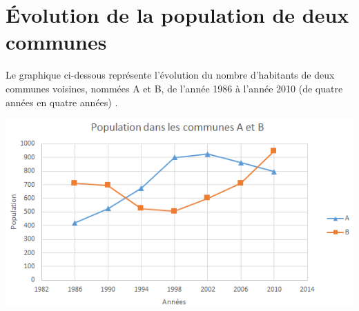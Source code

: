 \documentclass[a4paper,11pt]{exam}
\begin{document}
%	
%	
%		
%	
%	


\newpage

\section{\'Evolution de la population de deux communes}
	
	
	Le graphique ci-dessous représente l'évolution du nombre d'habitants de deux communes voisines, nommées A et B, de l'année 1986 à l'année 2010 (de quatre années en quatre années) .
	
	\begin{center}
		\includegraphics[scale=0.7]{./graph}
	\end{center}
\end{document}
